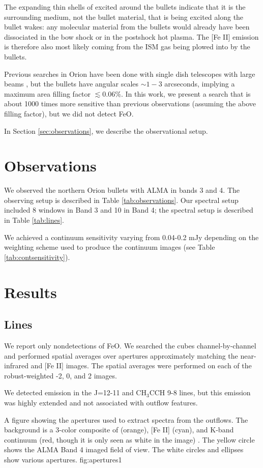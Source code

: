 \documentclass[twocolumn]{aastex61}
\begin{document}
The expanding thin shells of excited \hh around the bullets indicate that it is
the surrounding medium, not the bullet material, that is being excited along
the bullet wakes: any molecular material from the bullets would already have
been dissociated in the bow shock or in the postshock hot plasma.  The [Fe II]
emission is therefore also most likely coming from the ISM gas being plowed
into by the bullets.  

Previous searches in Orion have been done with single dish telescopes with
large beams \citep[40\arcsec;][]{Merer1982a}, but the bullets have angular
scales $\sim1-3$ arcseconds, implying a maximum area filling factor
$\lesssim0.06\%$.  In this work, we present a search that is about 1000 times more
sensitive than previous observations (assuming the above filling factor),
but we did not detect FeO.

In Section \ref{sec:observations}, we describe the observational setup.


\section{Observations}

We observed the northern Orion bullets with ALMA in bands 3 and 4.
The observing setup is described in Table \ref{tab:observations}.
Our spectral setup included 8 windows in Band 3 and 10 in Band 4;
the spectral setup is described in Table \ref{tab:lines}.





We achieved a continuum sensitivity varying from 0.04-0.2 mJy depending on the
weighting scheme used to produce the continuum images (see Table
\ref{tab:contsensitivity}).



\section{Results}
\subsection{Lines}
We report only nondetections of FeO.  We searched the cubes channel-by-channel
and performed spatial averages over apertures approximately matching the
near-infrared \hh and [Fe II] images.  The spatial averages were performed
on each of the robust-weighted -2, 0, and 2 images.

We detected emission in the \cyanoacetylene J=12-11 and CH$_3$CCH 9-8 lines,
but this emission was highly extended and not associated with outflow features.


{A figure showing the apertures used to extract spectra from the outflows.
The background is a 3-color composite of \hh (orange), [Fe II] (cyan), and
K-band continuum (red, though it is only seen as white in the image)
\citep{Bally2015a,Bally2017a}.
The yellow circle shows the ALMA Band 4 imaged field of view.  The white
circles and ellipses show various apertures.
}{fig:apertures}{1}{\textwidth}
\end{document}
